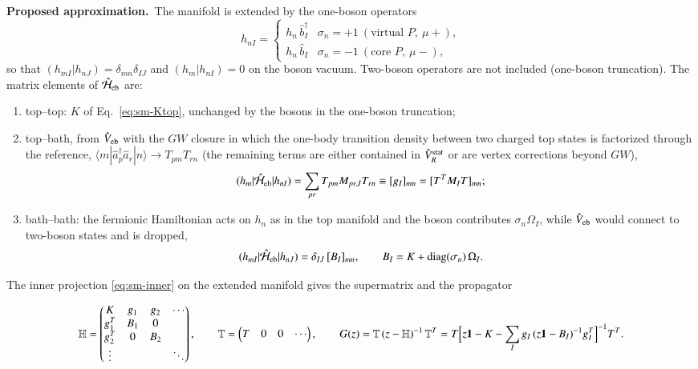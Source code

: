 \documentclass[aip,jcp,reprint,noshowkeys,superscriptaddress]{revtex4-1}
\newcommand{\Proposed}{\textbf{Proposed approximation.}\ }
\begin{document}
\Proposed The manifold is extended by the one-boson operators
\begin{equation}
  h_{nI}=\begin{cases}h_n\,\hat b_I^\dagger&\sigma_n=+1\ (\text{virtual }P,\ \mu+),\\
  h_n\,\hat b_I&\sigma_n=-1\ (\text{core }P,\ \mu-),\end{cases}
  \label{eq:sm-hnI}
\end{equation}
so that $(h_{mI}|h_{nJ})=\delta_{mn}\delta_{IJ}$ and
$(h_m|h_{nI})=0$ on the boson vacuum.  Two-boson operators are not included
(one-boson truncation).  The matrix elements of $\hat{\mathcal H}_{\rm eb}$
are:
\begin{enumerate}
\item top--top: $K$ of Eq.~\eqref{eq:sm-Ktop}, unchanged by the bosons in
  the one-boson truncation;
\item top--bath, from $\hat V_{\rm eb}$ with the $GW$ closure in which the
  one-body transition density between two charged top states is
  factorized through the reference,
  $\langle m|\hat a_p^\dagger\hat a_r|n\rangle\to T_{pm}T_{rn}$ (the
  remaining terms are either contained in $\hat V_R^{\rm stat}$ or are
  vertex corrections beyond $GW$),
  \begin{equation}
    (h_m|\hat{\mathcal H}_{\rm eb}|h_{nI})=\sum_{pr}T_{pm}M_{pr,I}T_{rn}
    \equiv[g_I]_{mn}=[T^{T}M_IT]_{mn};
    \label{eq:sm-g}
  \end{equation}
\item bath--bath: the fermionic Hamiltonian acts on $h_n$ as in the top
  manifold and the boson contributes $\sigma_n\Omega_I$, while
  $\hat V_{\rm eb}$ would connect to two-boson states and is dropped,
  \begin{equation}
    (h_{mI}|\hat{\mathcal H}_{\rm eb}|h_{nJ})=\delta_{IJ}\,[B_I]_{mn},\qquad
    B_I=K+\operatorname{diag}(\sigma_n)\,\Omega_I .
    \label{eq:sm-B}
  \end{equation}
\end{enumerate}
The inner projection \eqref{eq:sm-inner} on the extended manifold gives the
supermatrix and the propagator
\begin{widetext}
\begin{equation}
  \mathbb H=\begin{pmatrix}K&g_1&g_2&\cdots\\ g_1^{T}&B_1&0&\\ g_2^{T}&0&B_2&\\ \vdots&&&\ddots\end{pmatrix},
  \qquad
  \mathbb T=\begin{pmatrix}T&0&0&\cdots\end{pmatrix},
  \qquad
  G(z)=\mathbb T\,(z-\mathbb H)^{-1}\,\mathbb T^{T}
  =T\Bigl[z\mathbf 1-K-\sum_Ig_I\,(z\mathbf 1-B_I)^{-1}g_I^{T}\Bigr]^{-1}T^{T}.
  \label{eq:sm-supermatrix}
\end{equation}
\end{widetext}
\end{document}
